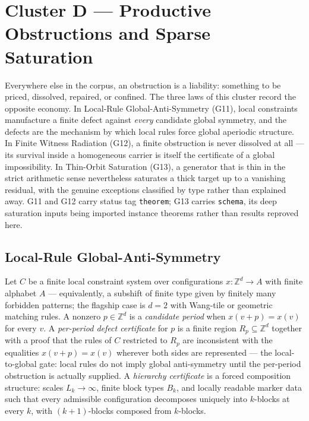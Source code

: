 \documentclass[11pt]{article}
\newcommand{\clusterD}{Productive Obstructions and Sparse Saturation}
\newcommand{\lawGEleven}{Local-Rule Global-Anti-Symmetry}
\newcommand{\lawGTwelve}{Finite Witness Radiation}
\newcommand{\lawGThirteen}{Thin-Orbit Saturation}
\theoremstyle{definition}
\begin{document}
\section{Cluster D --- \clusterD}\label{sec:clusterD}

Everywhere else in the corpus, an obstruction is a liability: something to be priced, dissolved,
repaired, or confined. The three laws of this cluster record the opposite economy. In \lawGEleven{}
(G11), local constraints manufacture a finite defect against \emph{every} candidate global symmetry,
and the defects are the mechanism by which local rules force global aperiodic structure. In
\lawGTwelve{} (G12), a finite obstruction is never dissolved at all --- its survival inside a
homogeneous carrier is itself the certificate of a global impossibility. In \lawGThirteen{} (G13), a
generator that is thin in the strict arithmetic sense nevertheless saturates a thick target up to a
vanishing residual, with the genuine exceptions classified by type rather than explained away. G11
and G12 carry status tag \texttt{theorem}; G13 carries \texttt{schema}, its deep saturation inputs
being imported instance theorems rather than results reproved here.

\subsection{\lawGEleven}\label{sec:clusterD:g11}

Let $C$ be a finite local constraint system over configurations $x : \mathbb{Z}^d \to A$ with finite
alphabet $A$ --- equivalently, a subshift of finite type given by finitely many forbidden patterns;
the flagship case is $d = 2$ with Wang-tile or geometric matching rules. A nonzero $p \in
\mathbb{Z}^d$ is a \emph{candidate period} when $x(v + p) = x(v)$ for every $v$. A \emph{per-period
defect certificate} for $p$ is a finite region $R_p \subseteq \mathbb{Z}^d$ together with a proof
that the rules of $C$ restricted to $R_p$ are inconsistent with the equalities $x(v+p) = x(v)$
wherever both sides are represented --- the local-to-global gate: local rules do not imply global
anti-symmetry until the per-period obstruction is actually supplied. A \emph{hierarchy certificate}
is a forced composition structure: scales $L_k \to \infty$, finite block types $B_k$, and locally
readable marker data such that every admissible configuration decomposes uniquely into $k$-blocks at
every $k$, with $(k{+}1)$-blocks composed from $k$-blocks.
\end{document}
